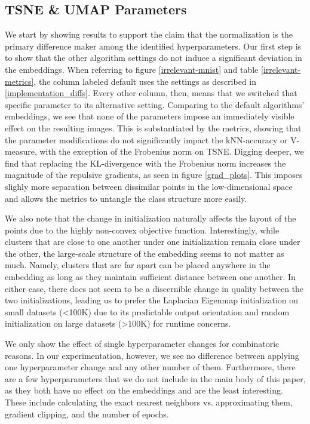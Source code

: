 \documentclass[sigconf, nonacm]{acmart}
\begin{document}
\subsection{TSNE \& UMAP Parameters}
We start by showing results to support the claim that the normalization is the primary difference maker among the identified hyperparameters. Our first step is
to show that the other algorithm settings do not induce a significant deviation in the embeddings. When referring to figure \ref{irrelevant-mnist} and table
\ref{irrelevant-metrics}, the column labeled default uses the settings as described in \ref{implementation_diffs}. Every other column, then, means that we
switched that specific parameter to its alternative setting. Comparing to the default algorithms' embeddings, we see that
none of the parameters impose an immediately visible effect on the resulting images. This is substantiated by the metrics, showing that 
the parameter modifications do not significantly impact the kNN-accuracy or V-measure, with the exception of the Frobenius norm on TSNE. Digging deeper, we find
that replacing the KL-divergence with the Frobenius norm increases the magnitude of the repulsive gradients, as seen in figure \ref{grad_plots}. This imposes
slighly more separation between dissimilar points in the low-dimensional space and allows the metrics to untangle the class structure more easily.

We also note that the change in initialization naturally affects the layout of the points due to the highly non-convex objective function. Interestingly, while
clusters that are close to one another under one initialization remain close under the other, the large-scale structure of the embedding seems to not matter as
much. Namely, clusters that are far apart can be placed anywhere in the embedding as long as they maintain sufficient distance between one another. In either
case, there does not seem to be a discernible change in quality between the two initializations, leading us to prefer the Laplacian Eigenmap initialization on
small datasets (<100K) due to its predictable output orientation and random initialization on large datasets (>100K) for runtime concerns.

We only show the effect of single hyperparameter changes for combinatoric reasons. In our experimentation, however, we see no difference between applying one
hyperparameter change and any other number of them. Furthermore, there are a few hyperparameters that we do not include in the main body of this paper, as they
both have no effect on the embeddings and are the least interesting. These include calculating the exact nearest neighbors vs. approximating them, gradient
clipping, and the number of epochs.
\end{document}

